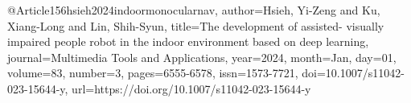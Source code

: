 @Article{156hsieh2024indoormonocularnav,
author={Hsieh, Yi-Zeng
and Ku, Xiang-Long
and Lin, Shih-Syun},
title={The development of assisted- visually impaired people robot in the indoor environment based on deep learning},
journal={Multimedia Tools and Applications},
year={2024},
month={Jan},
day={01},
volume={83},
number={3},
pages={6555-6578},
issn={1573-7721},
doi={10.1007/s11042-023-15644-y},
url={https://doi.org/10.1007/s11042-023-15644-y}
}